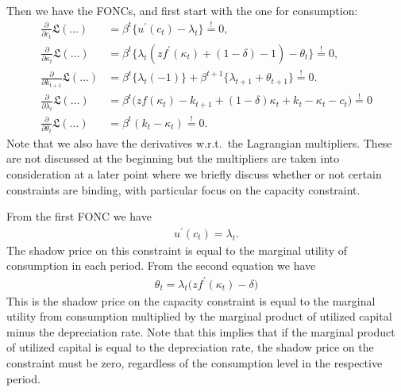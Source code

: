 \documentclass[a4paper]{article}
\theoremstyle{definition}
\begin{document}
Then we have the FONCs, and first start with the one for consumption:
	\begin{align}
	\frac{\partial}{\partial c_t}\mathfrak L(\dots) 			&= \beta^t \Big\{ u^\prime(c_t)-\lambda_t \Big\} \overset{!}{=}0, \\
	\frac{\partial}{\partial \kappa_t}\mathfrak L(\dots)		&= \beta^t \Big\{ \lambda_t( z f^\prime(\kappa_t)+(1-\delta)-1)-\theta_t \Big\} \overset{!}{=} 0, \\
	\frac{\partial}{\partial k_{t+1}}\mathfrak L(\dots)		&= \beta^t \Big\{ \lambda_t(-1) \Big\} + \beta^{t+1} \Big\{ \lambda_{t+1}+\theta_{t+1} \Big\} \overset{!}{=}0.  \\
	\frac{\partial}{\partial \lambda_t}\mathfrak L(\dots)	&= \beta^t \Big( z f(\kappa_t)- k_{t+1}+(1-\delta)\kappa_t+k_t - \kappa_t -c_t \Big) \overset{!}{=} 0 \nonumber \\
	\frac{\partial}{\partial \theta_t}\mathfrak L(\dots)		&= \beta^t (k_t - \kappa_t) \overset{!}{=} 0. \nonumber
	\end{align}
Note that we also have the derivatives w.r.t.\ the Lagrangian multipliers. These are not discussed at the beginning but the multipliers are taken into consideration at a later point where we briefly discuss whether or not certain constraints are binding, with particular focus on the capacity constraint.
	
From the first FONC we have
	\begin{align*}
	u^\prime(c_t) = \lambda_t.
	\end{align*}
The shadow price on this constraint is equal to the marginal utility of consumption in each period. From the second equation we have
	\begin{align*}
	\theta_t = \lambda_t\big( z f^\prime(\kappa_t)-\delta \big)
	\end{align*}
This is the shadow price on the capacity constraint is equal to the marginal utility from consumption multiplied by the marginal product of utilized capital minus the depreciation rate. Note that this implies that if the marginal product of utilized capital is equal to the depreciation rate, the shadow price on the constraint must be zero, regardless of the consumption level in the respective period.
	
\end{document}
